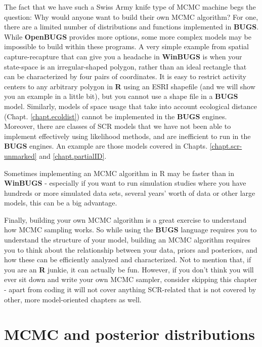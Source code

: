 The fact that we have such a Swiss Army knife type of MCMC machine
begs the question: Why would anyone want to build their own MCMC
algorithm? For one, there are a limited number of distributions and
functions implemented in {\bf BUGS}. While {\bf OpenBUGS} provides more
options, some more complex models may be impossible to build within
these programs. A very simple example from spatial capture-recapture
that can give you a headache in {\bf WinBUGS} is when your state-space is an
irregular-shaped polygon, rather than an ideal rectangle that can be
characterized by four pairs of coordinates. It is easy to restrict
activity centers to any arbitrary polygon in {\bf R} using an ESRI shapefile
(and we will show you an example in a little bit), but you cannot use
a shape file in a {\bf BUGS} model.  Similarly, models of space usage
that take into account ecological distance
(Chapt. \ref{chapt.ecoldist}) cannot be implemented in the {\bf BUGS}
engines.  Moreover, there are classes of 
SCR models that we have not been able to implement effectively using
likelihood methods, and are inefficient to run in the {\bf BUGS}
engines. An example are those models covered in Chapts. 
\ref{chapt.scr-unmarked} and \ref{chapt.partialID}. 

Sometimes implementing an MCMC algorithm in R may be faster than in
{\bf WinBUGS} - especially if you want to run simulation studies where you
have hundreds or more simulated data sets, several years' worth of
data or other large models, this can be a big advantage.

Finally, building your own MCMC algorithm is a great exercise to
understand how MCMC sampling works. So while using the {\bf BUGS} language requires you to understand the structure of your model, building an MCMC algorithm requires you to think about the relationship between your data, priors and posteriors, and how these can be efficiently analyzed and characterized. Not to mention that, if you are an {\bf R} junkie, it can actually be fun.
However, if you don't think you will ever sit down and write your own
MCMC sampler, consider skipping this chapter - apart from coding it
will not cover anything SCR-related that is not covered by other, more
model-oriented chapters as well.


\section{MCMC and posterior distributions}

